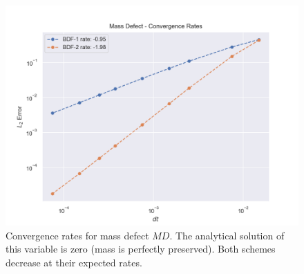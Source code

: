\documentclass[../../thesis.tex]{subfiles}
\begin{document}
\begin{figure}[h]
    \centering
    \includegraphics[width=1\columnwidth]{research_project/piston/figures/bdf_convergence/convergence_rates_mass.png}
    \caption{Convergence rates for mass defect $MD$.
    The analytical solution of this variable is zero (mass is perfectly preserved).
    Both schemes decrease at their expected rates.}
    \label{fig:bdf_convergence_mass}
\end{figure}


\end{document}
